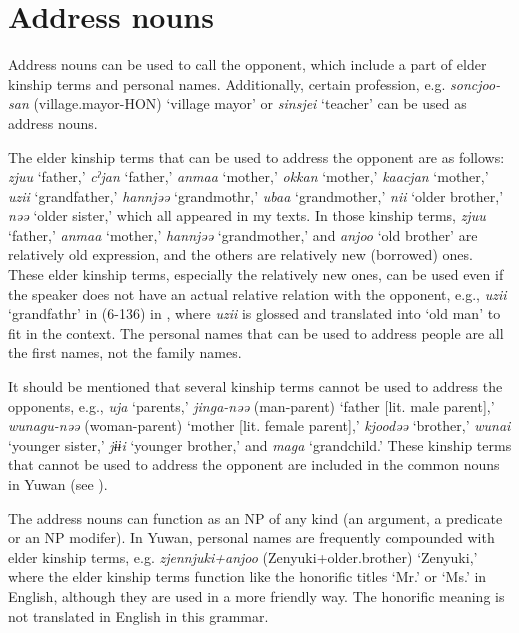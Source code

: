 \section{Address nouns}

Address nouns can be used to call the opponent, which include a part of elder kinship terms and personal names. Additionally, certain profession, e.g. \textit{soncjoo-san} (village.mayor-HON) ‘village mayor’ or \textit{sinsjei} ‘teacher’ can be used as address nouns.

The elder kinship terms that can be used to address the opponent are as follows: \textit{zjuu} ‘father,’ \textit{cˀjan} ‘father,’ \textit{anmaa} ‘mother,’ \textit{okkan} ‘mother,’ \textit{kaacjan} ‘mother,’ \textit{uzii} ‘grandfather,’ \textit{hannjəə} ‘grandmothr,’ \textit{ubaa} ‘grandmother,’ \textit{nii} ‘older brother,’ \textit{nəə} ‘older sister,’ which all appeared in my texts. In those kinship terms, \textit{zjuu} ‘father,’ \textit{anmaa} ‘mother,’ \textit{hannjəə} ‘grandmother,’ and \textit{anjoo} ‘old brother’ are relatively old expression, and the others are relatively new (borrowed) ones. These elder kinship terms, especially the relatively new ones, can be used even if the speaker does not have an actual relative relation with the opponent, e.g., \textit{uzii} ‘grandfathr’ in (6-136) in , where \textit{uzii} is glossed and translated into ‘old man’ to fit in the context. The personal names that can be used to address people are all the first names, not the family names.

It should be mentioned that several kinship terms cannot be used to address the opponents, e.g., \textit{uja} ‘parents,’ \textit{jinga-nəə} (man-parent) ‘father [lit. male parent],’ \textit{wunagu-nəə} (woman-parent) ‘mother [lit. female parent],’ \textit{kjoodəə} ‘brother,’ \textit{wunai} ‘younger sister,’ \textit{jɨɨi} ‘younger brother,’ and \textit{maga} ‘grandchild.’ These kinship terms that cannot be used to address the opponent are included in the common nouns in Yuwan (see ).

The address nouns can function as an NP of any kind (an argument, a predicate or an NP modifer). In Yuwan, personal names are frequently compounded with elder kinship terms, e.g. \textit{zjennjuki+anjoo} (Zenyuki+older.brother) ‘Zenyuki,’ where the elder kinship terms function like the honorific titles ‘Mr.’ or ‘Ms.’ in English, although they are used in a more friendly way. The honorific meaning is not translated in English in this grammar.

